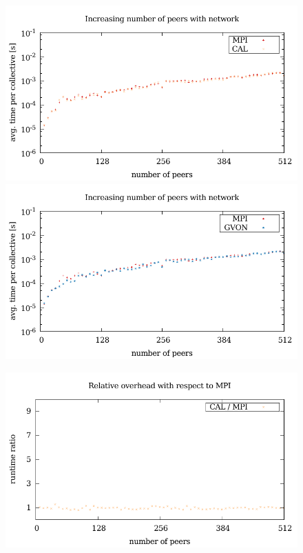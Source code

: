 \begin{figure}[H]
  \begin{minipage}[t]{0.5\textwidth}
    \includegraphics[width=\textwidth]{plots/50_collective_network_cal_laser}
    \includegraphics[width=\textwidth]{plots/50_collective_network_gvon_laser}
  \end{minipage}%
  \begin{minipage}[t]{0.5\textwidth}
    \includegraphics[width=\textwidth]{plots/50_collective_network_overhead_cal_laser}

\end{minipage}
\end{figure}
